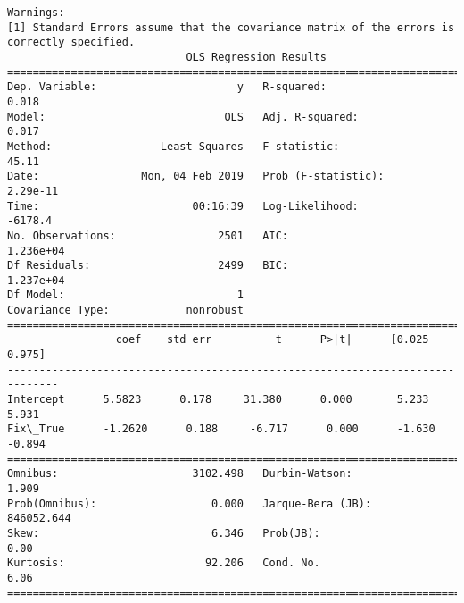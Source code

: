 \documentclass[11pt]{article}
\begin{document}
\begin{Verbatim}[commandchars=\\\{\}]
Warnings:
[1] Standard Errors assume that the covariance matrix of the errors is correctly specified.
                            OLS Regression Results                            
==============================================================================
Dep. Variable:                      y   R-squared:                       0.018
Model:                            OLS   Adj. R-squared:                  0.017
Method:                 Least Squares   F-statistic:                     45.11
Date:                Mon, 04 Feb 2019   Prob (F-statistic):           2.29e-11
Time:                        00:16:39   Log-Likelihood:                -6178.4
No. Observations:                2501   AIC:                         1.236e+04
Df Residuals:                    2499   BIC:                         1.237e+04
Df Model:                           1                                         
Covariance Type:            nonrobust                                         
==============================================================================
                 coef    std err          t      P>|t|      [0.025      0.975]
------------------------------------------------------------------------------
Intercept      5.5823      0.178     31.380      0.000       5.233       5.931
Fix\_True      -1.2620      0.188     -6.717      0.000      -1.630      -0.894
==============================================================================
Omnibus:                     3102.498   Durbin-Watson:                   1.909
Prob(Omnibus):                  0.000   Jarque-Bera (JB):           846052.644
Skew:                           6.346   Prob(JB):                         0.00
Kurtosis:                      92.206   Cond. No.                         6.06
==============================================================================


\end{Verbatim}
\end{document}
